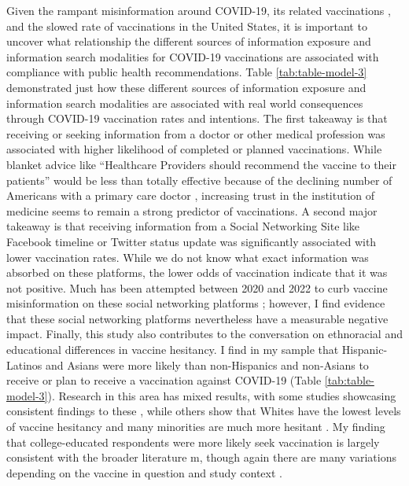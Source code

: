 Given the rampant misinformation around COVID-19, its related vaccinations
\citep{pathakInfodemicsCOVID19Role2020, mottaHowRightLeaningMedia2020,
shahsavariConspiracyTimeCorona2020}, and the slowed rate of vaccinations in the
United States, it is important to uncover what relationship the different
sources of information exposure and information search modalities for COVID-19
vaccinations are associated with compliance with public health recommendations.
Table \ref{tab:table-model-3} demonstrated just how these different sources of
information exposure and information search modalities are associated with real
world consequences through COVID-19 vaccination rates and intentions. The first
takeaway is that receiving or seeking information from a doctor or other medical
profession was associated with higher likelihood of completed or planned
vaccinations. While blanket advice like ``Healthcare Providers should recommend
the vaccine to their patients'' would be less than totally effective because of the declining
number of Americans with a primary care doctor \citep{levine_etal20}, increasing
trust in the institution of medicine seems to remain a strong predictor of
vaccinations. A second major takeaway is that receiving information from a
Social Networking Site like Facebook timeline or Twitter status update was
significantly associated with lower vaccination rates. While we do not know what
exact information was absorbed on these platforms, the lower odds of vaccination
indicate that it was not positive. Much has been attempted between 2020 and 2022
to curb vaccine misinformation on these social networking platforms
\citep[see][for an early example]{bowman20}; however, I find evidence that these
social networking platforms nevertheless have a measurable negative impact.
Finally, this study also contributes to the conversation on ethnoracial and
educational differences in vaccine hesitancy. I find in my sample that
Hispanic-Latinos and Asians were more likely than non-Hispanics and non-Asians
to receive or plan to receive a vaccination against COVID-19 (Table
\ref{tab:table-model-3}). Research in this area has mixed results, with some
studies showcasing consistent findings to these
\citep{bagasra_etal21,king_etal21}, while others show that Whites have the
lowest levels of vaccine hesitancy and many minorities are much more hesitant
\citep{momplaisir_etal21, foxworth21}. My finding that college-educated
respondents were more likely seek vaccination is largely consistent with the
broader literature m\citep{khairat_etal22}, though again there are many
variations depending on the vaccine in question and study context
\citep{siddiqui_etal13}.

